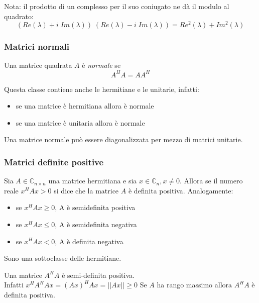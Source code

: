 Nota: il prodotto di un complesso per il suo coniugato ne dà il modulo
 al quadrato:
$$ (Re(\lambda) + i \; Im(\lambda)) \; (Re(\lambda) - i \; Im(\lambda)) = 
   Re^2(\lambda) + Im^2(\lambda)$$


\subsubsection{Matrici normali}
\begin{defn}
Una matrice quadrata $A$ \`e \emph{normale} se
$$ A^H A = A A^H $$
\end{defn}

Questa classe contiene anche le hermitiane e le unitarie, infatti:
\begin{itemize}
\item se una matrice \`e hermitiana allora \`e normale
\item se una matrice \`e unitaria allora \`e normale
\end{itemize}
\begin{property}
Una matrice normale pu\`o essere diagonalizzata per mezzo
di matrici unitarie.
\end{property}


\subsubsection{Matrici definite positive}
\begin{defn}
Sia $A \in \mathbb{C}_{n\times n}$ una matrice hermitiana e 
sia $x \in \mathbb{C}_n , x \neq 0$.
Allora se il numero reale $x^{H} Ax > 0$ si dice che la matrice $A$ \`e
definita positiva.
Analogamente:
\begin{itemize}
\item se $x^{H} Ax \geq 0$, \quad A \`e semidefinita positiva
\item se $x^{H} Ax \leq 0$, \quad A \`e semidefinita negativa
\item se $x^{H} Ax < 0$, \quad A \`e definita negativa
\end{itemize}
\end{defn}

Sono una sottoclasse delle hermitiane.

\begin{property}
\label{prop:def-pos}
Una matrice $A^{H}A$ \`e semi-definita positiva.\\
Infatti $x^{H}A^{H} Ax =(Ax)^{H} Ax = || Ax|| \geq 0$
Se $A$ ha rango massimo allora $A^{H}A$ è definita positiva.
\end{property}


